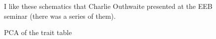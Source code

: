 \documentclass[
]{agujournal2019}
\begin{document}
\begin{figure}


\caption{\label{fig-outhwaite}I like these schematics that Charlie
Outhwaite presented at the EEB seminar (there was a series of them).}

\end{figure}%

\begin{figure}[H]


\caption{\label{fig-pca}PCA of the trait table}

\end{figure}%
\end{document}
